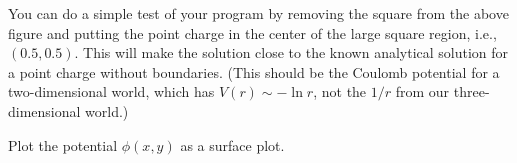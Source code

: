 You can do a simple test of your program by
removing the square from the above figure and putting the point charge in the center of the
large square region, i.e., \((0.5, 0.5)\). This will make the solution close to the known
analytical solution for a point charge without boundaries. (This should be the Coulomb
potential for a two-dimensional world, which has \(V(r) \sim -\ln r\), not the \(1/r\)
from our three-dimensional world.)


\Question{} Plot the potential \(\phi(x, y)\) as a surface plot.
\newline
